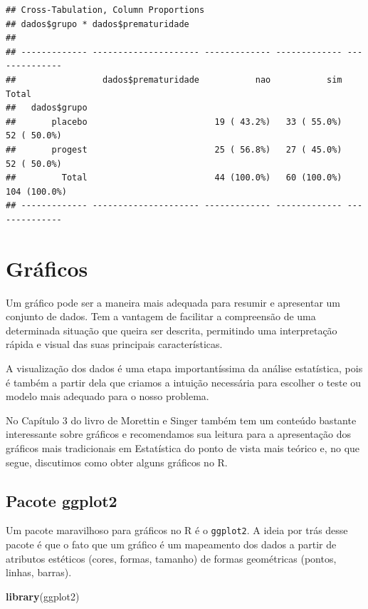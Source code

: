 \documentclass[
]{book}
\newenvironment{Shaded}{\begin{snugshade}}{\end{snugshade}}
\newcommand{\KeywordTok}[1]{\textcolor[rgb]{0.13,0.29,0.53}{\textbf{#1}}}
\newcommand{\NormalTok}[1]{#1}
\begin{document}
\begin{verbatim}
## Cross-Tabulation, Column Proportions  
## dados$grupo * dados$prematuridade  
## 
## ------------- --------------------- ------------- ------------- --------------
##                 dados$prematuridade           nao           sim          Total
##   dados$grupo                                                                 
##       placebo                         19 ( 43.2%)   33 ( 55.0%)    52 ( 50.0%)
##       progest                         25 ( 56.8%)   27 ( 45.0%)    52 ( 50.0%)
##         Total                         44 (100.0%)   60 (100.0%)   104 (100.0%)
## ------------- --------------------- ------------- ------------- --------------
\end{verbatim}

\hypertarget{gruxe1ficos}{%
\section{Gráficos}\label{gruxe1ficos}}

Um gráfico pode ser a maneira mais adequada para resumir e apresentar um conjunto de dados. Tem a vantagem de facilitar a compreensão de uma determinada situação que queira ser descrita, permitindo uma interpretação rápida e visual das suas principais características.

A visualização dos dados é uma etapa importantíssima da análise estatística, pois é também a partir dela que criamos a intuição necessária para escolher o teste ou modelo mais adequado para o nosso problema.

No Capítulo 3 do livro de Morettin e Singer também tem um conteúdo bastante interessante sobre gráficos e recomendamos sua leitura para a apresentação dos gráficos mais tradicionais em Estatística do ponto de vista mais teórico e, no que segue, discutimos como obter alguns gráficos no R.

\hypertarget{pacote-ggplot2}{%
\subsection{Pacote ggplot2}\label{pacote-ggplot2}}

Um pacote maravilhoso para gráficos no R é o \texttt{ggplot2}. A ideia por trás desse pacote é que o fato que um gráfico é um mapeamento dos dados a partir de atributos estéticos (cores, formas, tamanho) de formas geométricas (pontos, linhas, barras).

\begin{Shaded}
\begin{Highlighting}[]
\KeywordTok{library}\NormalTok{(ggplot2)}
\end{Highlighting}
\end{Shaded}
\end{document}
